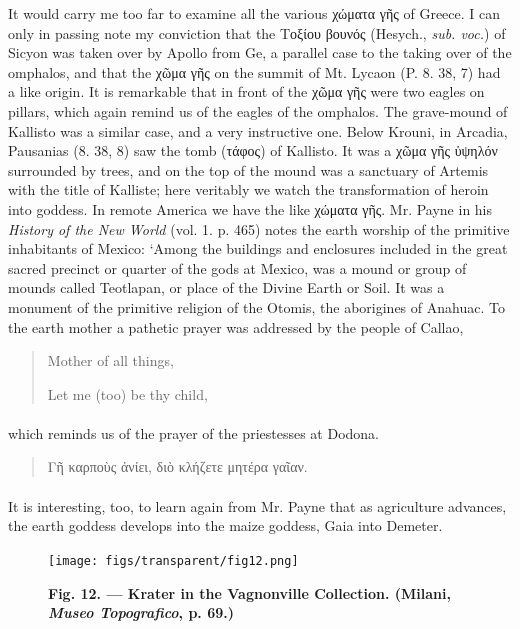 \documentclass[a4paper, 11pt, oneside, polutonikogreek, english]{article}
\begin{document}
It would carry me too far to examine all the various χώματα γῆς of Greece. I can only in passing note my conviction that the Τοξίου βουνός (Hesych., \emph{sub. voc.}) of Sicyon was taken over by Apollo from Ge, a parallel case to the taking over of the omphalos, and that the χῶμα γῆς on the summit of Mt. Lycaon (P. 8. 38, 7) had a like origin. It is remarkable that in front of the χῶμα γῆς were two eagles on pillars, which again remind us of the eagles of the omphalos. The grave-mound of Kallisto was a similar case, and a very instructive one. Below Krouni, in Arcadia, Pausanias (8. 38, 8) saw the tomb (τάφος) of Kallisto. It was a χῶμα γῆς ὑψηλόν surrounded by trees, and on the top of the mound was a sanctuary of Artemis with the title of Kalliste; here veritably we watch the transformation of heroin into goddess. In remote America we have the like χώματα γῆς. Mr. Payne in his \emph{History of the New World} (vol. 1. p. 465) notes the earth worship of the primitive inhabitants of Mexico: `Among the buildings and enclosures included in the great sacred precinct or quarter of the gods at Mexico, was a mound or group of mounds called Teotlapan, or place of the Divine Earth or Soil. It was a monument of the primitive religion of the Otomis, the aborigines of Anahuac. To the earth mother a pathetic prayer was addressed by the people of Callao,
\begin{quotation}
\large
Mother of all things,

Let me (too) be thy child,
\end{quotation}
\paragraph{}
which reminds us of the prayer of the priestesses at Dodona.
\begin{quotation}
\large
Γῆ καρποὺς ἀνίει, διὸ κλήζετε μητέρα γαῖαν.
\end{quotation}
\paragraph{}
It is interesting, too, to learn again from Mr. Payne that as agriculture advances, the earth goddess develops into the maize goddess, Gaia into Demeter.
\begin{figure}[H]
\centering
\texttt{[image: figs/transparent/fig12.png]}
\caption{\bfseries Fig. 12. --- Krater in the Vagnonville Collection. (Milani, \emph{Museo Topografico}, p. 69.)}
\end{figure}
\end{document}
